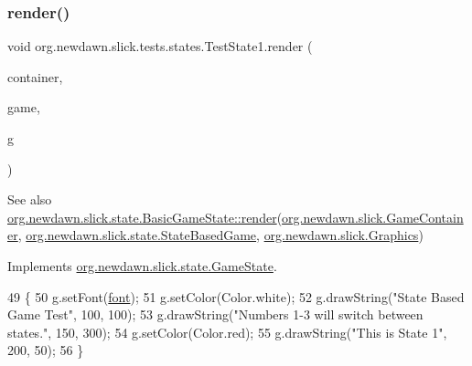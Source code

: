 \subsubsection{\texorpdfstring{render()}{render()}}
{\footnotesize\ttfamily void org.\+newdawn.\+slick.\+tests.\+states.\+Test\+State1.\+render (\begin{DoxyParamCaption}\item[{\mbox{\hyperlink{classorg_1_1newdawn_1_1slick_1_1_game_container}{Game\+Container}}}]{container,  }\item[{\mbox{\hyperlink{classorg_1_1newdawn_1_1slick_1_1state_1_1_state_based_game}{State\+Based\+Game}}}]{game,  }\item[{\mbox{\hyperlink{classorg_1_1newdawn_1_1slick_1_1_graphics}{Graphics}}}]{g }\end{DoxyParamCaption})\hspace{0.3cm}{\ttfamily [inline]}}

\begin{DoxySeeAlso}{See also}
\mbox{\hyperlink{interfaceorg_1_1newdawn_1_1slick_1_1state_1_1_game_state_a065352d2725274c5244cd022f226eb17}{org.\+newdawn.\+slick.\+state.\+Basic\+Game\+State\+::render}}(\mbox{\hyperlink{classorg_1_1newdawn_1_1slick_1_1_game_container}{org.\+newdawn.\+slick.\+Game\+Container}}, \mbox{\hyperlink{classorg_1_1newdawn_1_1slick_1_1state_1_1_state_based_game}{org.\+newdawn.\+slick.\+state.\+State\+Based\+Game}}, \mbox{\hyperlink{classorg_1_1newdawn_1_1slick_1_1_graphics}{org.\+newdawn.\+slick.\+Graphics}}) 
\end{DoxySeeAlso}


Implements \mbox{\hyperlink{interfaceorg_1_1newdawn_1_1slick_1_1state_1_1_game_state_a065352d2725274c5244cd022f226eb17}{org.\+newdawn.\+slick.\+state.\+Game\+State}}.


\begin{DoxyCode}
49                                                                                  \{
50         g.setFont(\mbox{\hyperlink{classorg_1_1newdawn_1_1slick_1_1tests_1_1states_1_1_test_state1_aa468e72bb425e9f217e3580c6bfae716}{font}});
51         g.setColor(Color.white);
52         g.drawString(\textcolor{stringliteral}{"State Based Game Test"}, 100, 100);
53         g.drawString(\textcolor{stringliteral}{"Numbers 1-3 will switch between states."}, 150, 300);
54         g.setColor(Color.red);
55         g.drawString(\textcolor{stringliteral}{"This is State 1"}, 200, 50);
56     \}
\end{DoxyCode}
\mbox{\label{classorg_1_1newdawn_1_1slick_1_1tests_1_1states_1_1_test_state1_af8ac211813005d2976684963c46986f8}} 
